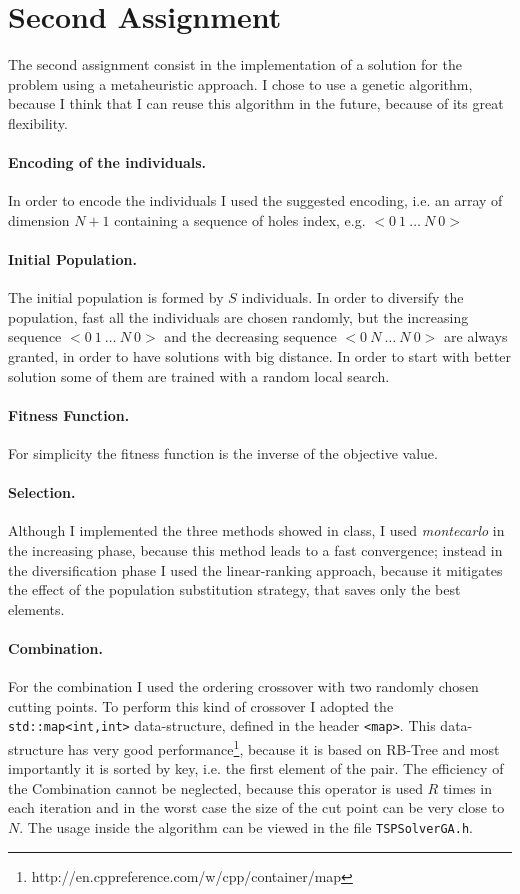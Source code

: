 \section{Second Assignment}
The second assignment consist in the implementation of a solution for the problem
using a metaheuristic approach.
I chose to use a genetic algorithm, because I think that I can reuse this algorithm
in the future, because of its great flexibility.
\paragraph{Encoding of the individuals.} In order to encode the individuals I used the suggested
encoding, i.e. an array of dimension $N+1$ containing a sequence of holes index, e.g.
$<0\ 1\ \dots\ N\ 0>$

\paragraph{Initial Population.} The initial population is formed by $S$ individuals.
In order to diversify the population, fast all the individuals are chosen randomly, but
the increasing sequence $<0\ 1\ \dots\ N\ 0>$ and the decreasing sequence $<0\ N\ \dots\ N\ 0>$
are always granted, in order to have solutions with big distance. 
In order to start with better solution some of them are trained with a random local search.

\paragraph{Fitness Function.} For simplicity the fitness function is the inverse of the
objective value.

\paragraph{Selection.} Although I implemented the three methods showed in class, I used \emph{montecarlo}
in the increasing phase, because this method leads to a fast convergence; instead in the diversification phase I used the linear-ranking approach, because it
mitigates the effect of the population substitution strategy, that 
saves only the best elements.

\paragraph{Combination.} For the combination I used the ordering crossover with two randomly
chosen cutting points. To perform this kind of crossover I adopted the
\verb|std::map<int,int>| data-structure, defined in the header \verb|<map>|. This data-structure
has very good performance\footnote{http://en.cppreference.com/w/cpp/container/map}, because it is based on RB-Tree
and most importantly it is sorted by key, i.e. the first element of the pair.
The efficiency of the Combination cannot be neglected, because this operator is used $R$ times in each
iteration and in the worst case the size of the cut point can be very close to $N$.
The usage inside the algorithm can be viewed in the file \verb|TSPSolverGA.h|. 

